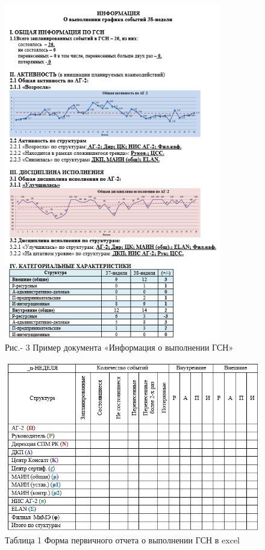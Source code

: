 \begin{figure}[H]
	\centering
	\includegraphics[width=0.84\textwidth]{media/ekon/image3}
	\caption*{Рис.- 3 Пример документа «Информация о выполнении ГСН»}
\end{figure}

\begin{figure}[H]
  \caption*{Таблица 1 Форма первичного отчета о выполнении ГСН в excel}
	\centering
	\includegraphics[width=\textwidth]{media/ekon/image3.2}
\end{figure}

